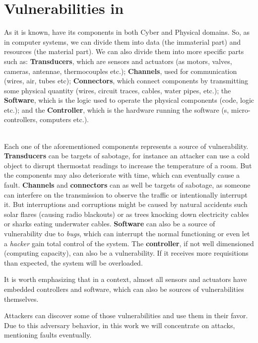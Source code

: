 \documentclass[../main.tex]{subfiles}
\begin{document}
\section{Vulnerabilities in \cps{}}

As it is known, \cps{} have its components in both Cyber and Physical domains.
So, as in computer systems, we can divide them into data (the immaterial part) and resources (the material part). We can also divide them into more specific parts such as: \textbf{Transducers}, which are sensors and actuators (as motors, valves, cameras, antennae, thermocouples etc.);
\textbf{Channels}, used for communication (wires, air, tubes etc); \textbf{Connectors}, which connect components by transmitting some physical quantity (wires, circuit traces, cables, water pipes, etc.);
the \textbf{Software}, which is the logic used to operate the physical components (code, \plc{} logic etc.); and the \textbf{Controller}, which is the hardware running the software (\plc{}s, micro-controllers, computers etc.).

~\\Each one of the aforementioned components represents a source of vulnerability.
\\\textbf{Transducers} can be targets of sabotage, for instance an attacker can use a cold object to disrupt thermostat readings to increase the temperature of a room. But the components may also deteriorate with time, which can eventually cause a fault.
\textbf{Channels} and \textbf{connectors} can as well be targets of sabotage, as someone can interfere on the transmission to observe the traffic or intentionally interrupt it. But interruptions and corruptions might be caused by natural accidents such solar flares (causing radio blackouts) or as trees knocking down electricity cables or sharks eating underwater cables.
\textbf{Software} can also be a source of vulnerability due to \emph{bugs}, which can interrupt the normal functioning or even let a \emph{hacker} gain total control of the system.
The \textbf{controller}, if not well dimensioned (computing capacity), can also be a vulnerability.
If it receives more requisitions than expected, the system will be overloaded.

It is worth emphasizing that in a \iot{} context, almost all sensors and actuators have embedded controllers and software, which can also be sources of vulnerabilities themselves.

Attackers can discover some of those vulnerabilities and use them in their favor. Due to this adversary behavior, in this work we will concentrate on attacks, mentioning faults eventually.
\end{document}
